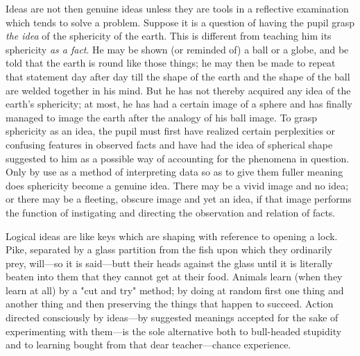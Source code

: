\documentclass[showtrims,ustradepaper]{memoir}
\begin{document}

Ideas are not then genuine ideas unless they are tools in a reflective
examination which tends to solve a problem. Suppose it is a question of
having the pupil grasp \emph{the idea} of the sphericity of the earth.
This is different from teaching him its sphericity \emph{as a fact}. He
may be shown (or reminded of) a ball or a globe, and be told that the
earth is round like those things; he may then be made to repeat that
statement day after day till the shape of the earth and the shape of the
ball are welded together in his mind. But he has not thereby acquired
any idea of the earth's sphericity; at most, he has had a certain image
of a sphere and has finally managed to image the earth after the analogy
of his ball image. To grasp sphericity as an idea, the pupil must first
have realized certain perplexities or confusing features in observed
facts and have had the idea of spherical shape suggested to him as a
possible way of accounting for the phenomena in question. Only by use as
a method of interpreting data so as to give them fuller meaning does
sphericity become a genuine idea. There may be a vivid image and no
idea; or there may be a fleeting, obscure image and yet an idea, if that
image performs the function of instigating and directing the observation
and relation of facts.


Logical ideas are like keys which are shaping with reference to opening
a lock. Pike, separated by a glass partition from the fish upon which
they ordinarily prey, will---so it is said---butt their heads against
the glass until it is literally beaten into them that they cannot get at
their food. Animals learn (when they learn at all) by a "cut and try"
method; by doing at
random
first one thing and another thing and then preserving the things that
happen to succeed. Action directed consciously by ideas---by suggested
meanings accepted for the sake of experimenting with them---is the sole
alternative both to bull-headed stupidity and to learning bought from
that dear teacher---chance experience.

\end{document}
